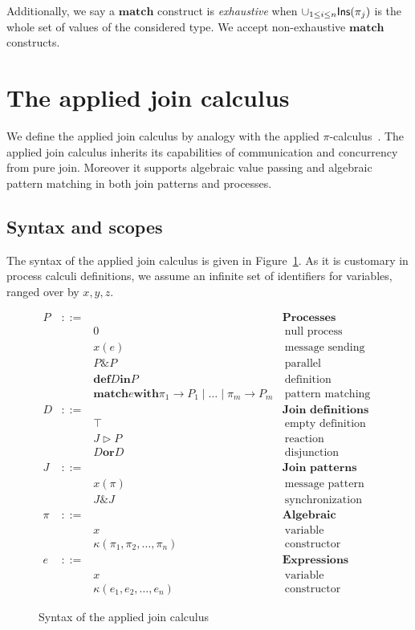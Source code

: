 \documentclass{LMCS}
\renewcommand{\exp}{e}
\newcommand{\const}{\kappa}
\newcommand{\pt}{\pi}
\newcommand{\ins}[1]{{\sf Ins}(#1)}
\newcommand{\kwd}[1]{\ensuremath{\mathbf{#1}}}
\newcommand{\prefix}[1]{\mathopen{}\mathrel{\kwd {#1}}}
\newcommand{\infix}[1]{\mathrel{\kwd {#1}}}
\renewcommand{\_}{\mathord{\rule[-.25ex]{1ex}{.15ex}}}
\newcommand{\appnv}[4]{{#1}(#2, #3, \ldots{} , #4)}
\newcommand{\nullp}{0}
\newcommand{\para}[2]{#1\mathop{\&}#2}
\newcommand{\dis}[2]{#1\infix{or}#2}
\newcommand{\define}[2]{\prefix{def} #1 \infix{in} #2}
\newcommand{\matchfour}[4]{\prefix{match}  #1 \infix{with} #2_1
  \rightarrow #3_1 \mid \ldots \mid #2_{#4} \rightarrow #3_{#4}}
\newcommand{\reaction}[2]{#1 \triangleright #2}
\begin{document}
Additionally, we say a \kwd{match} construct is \emph{exhaustive}
when $\cup_{1 \le i \le n}
\ins{\pt_j}$ is the whole set of values of the considered type.
We accept non-exhaustive \kwd{match} constructs.


\section{The applied join calculus}
\label{sec.joinpi}

We define the applied join calculus by analogy with the applied
$\pi$-calculus~\cite{AppliedPi}. The applied join calculus inherits
its capabilities of communication and concurrency from pure join.
Moreover it supports algebraic value passing and algebraic pattern
matching in both join patterns and processes.

\subsection{Syntax and scopes}
\label{subsec.syntax}

The syntax of the applied join calculus is given in
Figure~\ref{fig.syntax}. As it is customary in process calculi
definitions, we assume an infinite set of
identifiers for variables, ranged over by $x, y, z$.

\begin{figure}[ht]
\centering
$$
\begin{array}{lcll}
P & ::=  &  & \textbf{Processes}\\
&& \nullp &  \ \textrm{null process}\\
&& x(\exp)& \ \textrm{message sending}\\
&& \para{P}{P} & \ \textrm{parallel}\\
&& \define{D}{P} & \ \textrm{definition}\\
&& \matchfour{\exp}{\pt}{P}{m} & \ \textrm{pattern matching}
\\
D & ::= & & \textbf{Join definitions}\\
&& \top & \ \textrm{empty definition}\\
&& \reaction{J}{P} & \ \textrm{reaction}\\
&& \dis{D}{D} & \ \textrm{disjunction}
\\
J & ::= & & \textbf{Join patterns}\\
&& x(\pt) & \ \textrm{message pattern}\\
&& \para{J}{J} & \ \textrm{synchronization}
\\
\pt & ::= & & \textbf{Algebraic patterns}\\
&& x & \ \textrm{variable}\\
&& \appnv{\const}{\pt_1}{\pt_2}{\pt_n} & \ \textrm{constructor pattern}
\\
\exp & ::= && \textbf{Expressions}\\
&& x & \ \textrm{variable}\\
&& \appnv{\const}{\exp_1}{\exp_2}{\exp_n} & \ \textrm{constructor expression}
\end{array}
$$
\caption{Syntax of the applied join calculus}\label{fig.syntax}
\end{figure}
\end{document}
